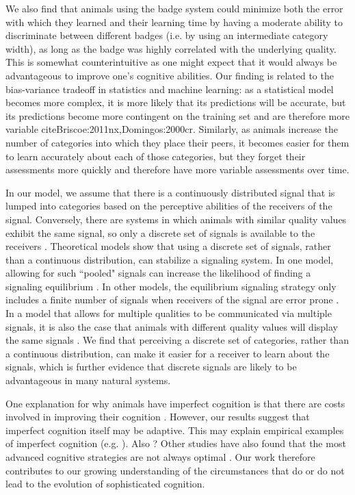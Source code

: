 We also find that animals using the badge system could minimize both the error with which they learned and their learning time by having a moderate ability to discriminate between different badges (i.e. by using an intermediate category width), as long as the badge was highly correlated with the underlying quality. This is somewhat counterintuitive as one might expect that it would always be advantageous to improve one's cognitive abilities. Our finding is related to the bias-variance tradeoff in statistics and machine learning: as a statistical model becomes more complex, it is more likely that its predictions will be accurate, but its predictions become more contingent on the training set and are therefore more variable cite{Briscoe:2011nx,Domingos:2000cr}. Similarly, as animals increase the number of categories into which they place their peers, it becomes easier for them to learn accurately about each of those categories, but they forget their assessments more quickly and therefore have more variable assessments over time. 

In our model, we assume that there is a continuously distributed signal that is lumped into categories based on the perceptive abilities of the receivers of the signal. Conversely, there are systems in which animals with similar quality values exhibit the same signal, so only a discrete set of signals is available to the receivers \cite{Johnstone:1994uq}. Theoretical models show that using a discrete set of signals, rather than a continuous distribution, can stabilize a signaling system. In one model, allowing for such ``pooled" signals can increase the likelihood of finding a signaling equilibrium \cite{Lachmann:1998fk}. In other models, the equilibrium signaling strategy only includes a finite number of signals when receivers of the signal are error prone \cite{Johnstone:1994uq,Grafen:1993kx}.  In a model that allows for multiple qualities to be communicated via multiple signals, it is also the case that animals with different quality values will display the same signals \cite{Johnstone:1995vn}. We find that perceiving a discrete set of categories, rather than a continuous distribution, can make it easier for a receiver to learn about the signals, which is further evidence that discrete signals are likely to be advantageous in many natural systems.


One explanation for why animals have imperfect cognition is that there are costs involved in improving their cognition \cite{Gavrilets:2006fk}. However, our results suggest that imperfect cognition itself may be adaptive. This may explain empirical examples of imperfect cognition (e.g. \cite{Kikuchi:2010ys}). Also \cite{Stoddard:2011zr}?
Other studies have also found that the most advanced cognitive strategies are not always optimal \cite{Brush:2016kx,Kerr:2003vn,Dunlap:2009vn,Stephens:1991fk}. Our work therefore contributes to our growing understanding of the circumstances that do or do not lead to the evolution of sophisticated cognition.

